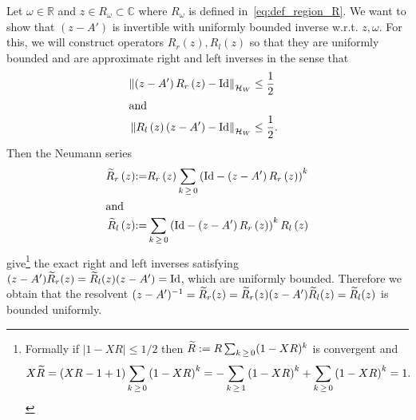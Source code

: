 \documentclass[AHL,Unicode,longabstracts,published]{cedram}
\newcommand{\clH}{\mathcal{H}}
\newcommand{\Id}{\mathrm{Id}}
\newcommand{\bbR}{\mathbb{R}}
\newcommand{\bbC}{\mathbb{C}}
\let\oldtilde\tilde
\renewcommand*{\tilde}[1]{\mathchoice{\widetilde{#1}}{\widetilde{#1}}{\oldtilde{#1}}{\oldtilde{#1}}}
\newcommand{\clH}{\mathcal{H}}
\newcommand{\bbR}{\mathbb{R}}
\begin{document}
Let $\omega\in\bbR$ and $z\in R_{\omega}\subset\bbC$ where $R_{\omega}$ is defined in~\eqref{eq:def_region_R}. We want to show that $(z-A')$ is invertible with uniformly bounded inverse w.r.t. $z,\omega$. For this, we will construct operators $R_{r}(z),R_{l}(z)$ so that they are uniformly bounded and are approximate right and left inverses in the sense that
\begin{align}
\left\Vert \left(z-A'\right)R_{r}\left(z\right)-\Id \right\Vert _{\clH _{W}} & \leq\frac{1}{2}\quad\label{eq:almost_inverse}\\
\intertext{and}
\left\Vert R_{l}\left(z\right)\left(z-A'\right)-\Id \right\Vert _{\clH _{W}} & \leq\frac{1}{2}.
\end{align}
Then the Neumann series
\begin{align*}
\tilde{R}_{r}\left(z\right) &{:=}  R_{r}\left(z\right)\sum_{k\,\geq\,0}\left(\Id -\left(z-A'\right)R_{r}\left(z\right)\right)^{k}\\
\intertext{and}
\tilde{R}_{l}\left(z\right) &{:=}  \sum_{k\,\geq\,0}\left(\Id -\left(z-A'\right)R_{r}\left(z\right)\right)^{k}R_{l}\left(z\right)
\end{align*}
give\footnote{Formally if $|1-XR|\leq1/2$ then $\tilde{R}:=R\sum_{k\,\geq\,0}(1-XR)^{k}$ is convergent and
\[
X\tilde{R}=\left(XR-1+1\right)\sum_{k\,\geq\,0}\left(1-XR\right)^{k}=-\sum_{k\,\geq\,1}\left(1-XR\right)^{k}+\sum_{k\,\geq\,0}\left(1-XR\right)^{k}=1.
\]}
the exact right and left inverses satisfying $(z-A')\tilde{R}_{r}(z)=\tilde{R}_{l}(z)(z-A')=\Id $, which are uniformly bounded. Therefore we obtain that the resolvent $(z-A')^{-1}=\tilde{R}_{r}(z)=\tilde{R}_{r}(z)(z-A')\tilde{R}_{l}(z)=\tilde{R}_{l}(z)$ is bounded uniformly.
\end{document}
